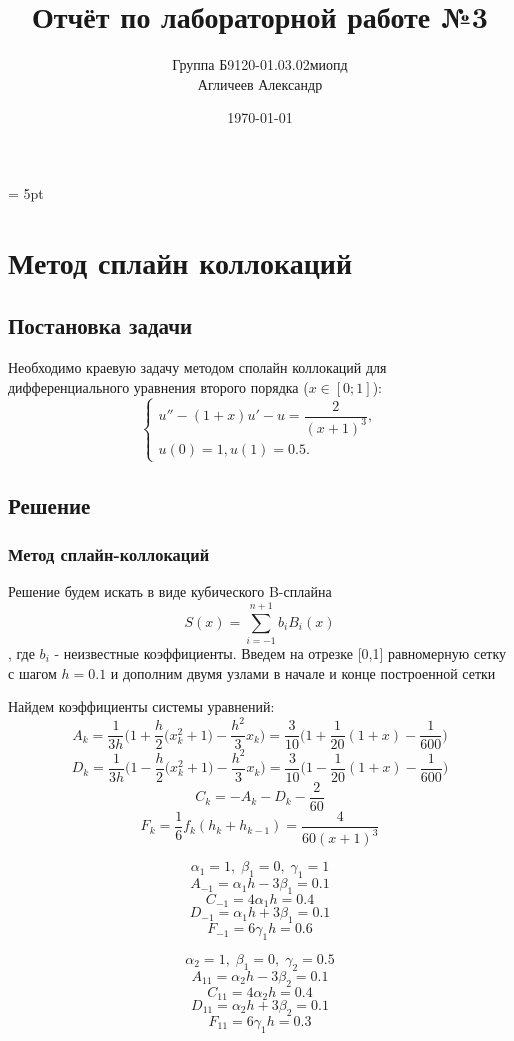 \documentclass[a4paper, 14pt, fleqn]{extarticle}
\author {
	Группа Б9120-01.03.02миопд\\
	Агличеев Александр
}
\title {
	Отчёт по лабораторной работе №3	
}
\date {
	\today
}
\begin{document}
	\maketitle
	\pagebreak
	\parskip = 5pt

	\section{Метод сплайн коллокаций}
		\subsection{Постановка задачи}
			\noindent Необходимо краевую задачу методом сполайн коллокаций для дифференциального уравнения второго порядка ($x \in [0;1]$):
			\begin{equation*}
				\begin{cases}
					u'' - (1+x)u' - u = \dfrac{2}{(x+1)^3},
					\\
					u(0) = 1,
					u(1) = 0.5. 
				\end{cases}
			\end{equation*}
	
		\subsection{Решение}
			
			\subsubsection{Метод сплайн-коллокаций}
			
				Решение будем искать в виде кубического B-сплайна
				\[ S(x) = \sum_{i=-1}^{n+1} b_i B_i(x) \]
				, где $b_i$ - неизвестные коэффициенты. 
				Введем на отрезке [0,1] равномерную сетку с шагом $h = 0.1$ и дополним двумя узлами в начале и конце построенной сетки				
				
				Найдем коэффициенты системы уравнений:
				\[ A_k = \dfrac{1}{3h}\bigg(1 + \dfrac{h}{2}\Big(x^2_k+1\Big) -\dfrac{h^2}{3} x_k\bigg) = \dfrac{3}{10}\bigg(1+\dfrac{1}{20}(1+x) - \dfrac{1}{600} \bigg)\]
				\[ D_k = \dfrac{1}{3h}\bigg(1 - \dfrac{h}{2}\Big(x^2_k+1\Big) -\dfrac{h^2}{3} x_k\bigg) = \dfrac{3}{10}\bigg(1-\dfrac{1}{20}(1+x) - \dfrac{1}{600} \bigg)\]
				\[ C_k = -A_k - D_k - \dfrac{2}{60} \]
				\[F_k = \dfrac{1}{6} f_k(h_k + h_{k-1}) = \dfrac{4}{60(x+1)^3} \]
				
				\begin{minipage}{0.45\textwidth}
					\[ \alpha_1 = 1,\;\beta_1 = 0,\;\gamma_1 = 1 \]
					\[A_{-1} = \alpha_1 h - 3 \beta_1 = 0.1 \]
					\[C_{-1} = 4\alpha_1 h = 0.4 \]
					\[D_{-1} = \alpha_1 h + 3 \beta_1 = 0.1 \]
					\[F_{-1} = 6\gamma_1 h = 0.6 \]
				\end{minipage}%
				\begin{minipage}{0.45\textwidth}
					\[ \alpha_2 = 1,\;\beta_1 = 0,\;\gamma_2 = 0.5 \]
					\[A_{11} = \alpha_2 h - 3 \beta_2 = 0.1 \]
					\[C_{11} = 4\alpha_2 h = 0.4 \]
					\[D_{11} = \alpha_2 h + 3 \beta_2 = 0.1 \]
					\[F_{11} = 6\gamma_1 h = 0.3 \]
				\end{minipage}%
			
\end{document}
